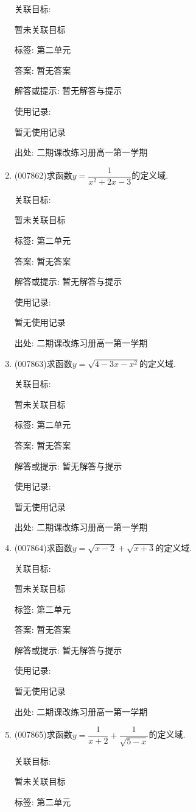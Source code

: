 \documentclass[10pt,a4paper]{article}
\begin{document}
\begin{enumerate}[1.]
关联目标:

暂未关联目标



标签: 第二单元

答案: 暂无答案

解答或提示: 暂无解答与提示

使用记录:

暂无使用记录


出处: 二期课改练习册高一第一学期
\item { (007862)}求函数$y=\dfrac 1{x^2+2x-3}$的定义域.


关联目标:

暂未关联目标



标签: 第二单元

答案: 暂无答案

解答或提示: 暂无解答与提示

使用记录:

暂无使用记录


出处: 二期课改练习册高一第一学期
\item { (007863)}求函数$y=\sqrt {4-3x-x^2}$的定义域.


关联目标:

暂未关联目标



标签: 第二单元

答案: 暂无答案

解答或提示: 暂无解答与提示

使用记录:

暂无使用记录


出处: 二期课改练习册高一第一学期
\item { (007864)}求函数$y=\sqrt {x-2}+\sqrt {x+3}$的定义域.


关联目标:

暂未关联目标



标签: 第二单元

答案: 暂无答案

解答或提示: 暂无解答与提示

使用记录:

暂无使用记录


出处: 二期课改练习册高一第一学期
\item { (007865)}求函数$y=\dfrac 1{x+2}+\dfrac 1{\sqrt {5-x}}$的定义域.


关联目标:

暂未关联目标



标签: 第二单元


\end{enumerate}
\end{document}
